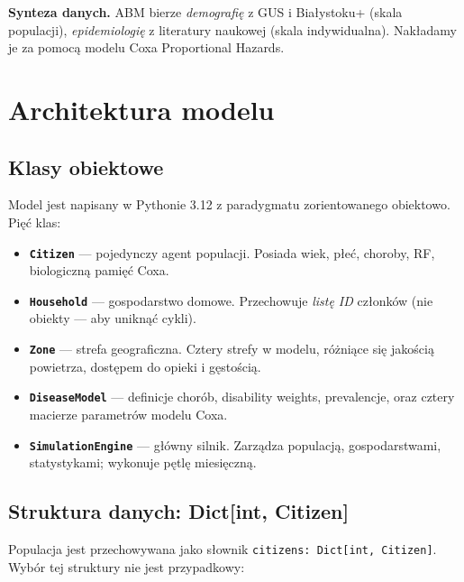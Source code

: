 \documentclass[11pt,a4paper]{article}
\begin{document}
\begin{infobox}
\textbf{Synteza danych.} ABM bierze \emph{demografię} z GUS i Białystoku+ (skala populacji), \emph{epidemiologię} z literatury naukowej (skala indywidualna). Nakładamy je za pomocą modelu Coxa Proportional Hazards.
\end{infobox}

\newpage
\section{Architektura modelu}

\subsection{Klasy obiektowe}

Model jest napisany w Pythonie 3.12 z paradygmatu zorientowanego obiektowo. Pięć klas:

\begin{itemize}[leftmargin=*, itemsep=4pt]
  \item \textbf{\texttt{Citizen}} --- pojedynczy agent populacji. Posiada wiek, płeć, choroby, RF, biologiczną pamięć Coxa.
  \item \textbf{\texttt{Household}} --- gospodarstwo domowe. Przechowuje \emph{listę ID} członków (nie obiekty --- aby uniknąć cykli).
  \item \textbf{\texttt{Zone}} --- strefa geograficzna. Cztery strefy w modelu, różniące się jakością powietrza, dostępem do opieki i gęstością.
  \item \textbf{\texttt{DiseaseModel}} --- definicje chorób, disability weights, prevalencje, oraz cztery macierze parametrów modelu Coxa.
  \item \textbf{\texttt{SimulationEngine}} --- główny silnik. Zarządza populacją, gospodarstwami, statystykami; wykonuje pętlę miesięczną.
\end{itemize}

\subsection{Struktura danych: Dict[int, Citizen]}

Populacja jest przechowywana jako słownik \texttt{citizens: Dict[int, Citizen]}. Wybór tej struktury nie jest przypadkowy:
\end{document}
